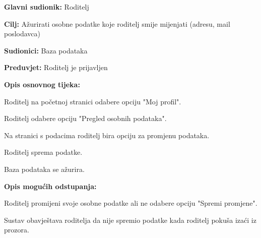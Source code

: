 					\noindent {}
					\begin{packed_item}
						
						\item \textbf{Glavni sudionik: }Roditelj
						\item  \textbf{Cilj:} Ažurirati osobne podatke koje roditelj smije mijenjati (adresu, mail poslodavca)
						\item  \textbf{Sudionici:} Baza podataka
						\item  \textbf{Preduvjet:} Roditelj je prijavljen
						\item  \textbf{Opis osnovnog tijeka:}
						
						\item[] \begin{packed_enum}
							
							\item Roditelj na početnoj stranici odabere opciju "Moj profil". 
							\item Roditelj odabere opciju "Pregled osobnih podataka".
							\item Na stranici s podacima roditelj bira opciju za promjenu podataka.
							\item Roditelj sprema podatke.
							\item Baza podataka se ažurira.
						\end{packed_enum}
						
						\item  \textbf{Opis mogućih odstupanja:}
						
						\item[] \begin{packed_item}
							
							\item[4.a] Roditelj promijeni svoje osobne podatke ali ne odabere opciju "Spremi promjene".
							\item[] \begin{packed_enum}
								
								\item Sustav obavještava roditelja da nije spremio podatke kada roditelj pokuša izaći iz prozora.
							\end{packed_enum}
							
						\end{packed_item}
					\end{packed_item}
					
